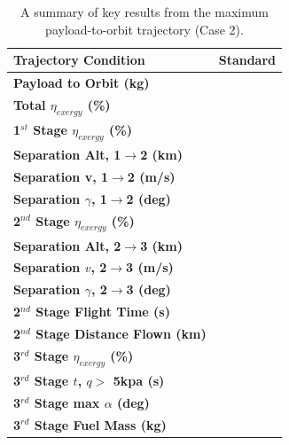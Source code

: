 \begin{table}[ht]
	\centering
\begin{tabular}{l c } 
	\hline \textbf{Trajectory Condition}
	&Standard
	\\
	\hline \textbf{Payload to Orbit (kg)}
	& \textbf{\PayloadToOrbitStandardNoReturn}
	\\
	\textbf{Total $\eta_{exergy}$ (\%)}
	& \textbf{\totalExergyEffStandardNoReturn}
	\\
	\hline 
	\textbf{1$^{st}$ Stage $\eta_{exergy}$ (\%)}
	& \textbf{\firstExergyEffStandardNoReturn}
	\\

	\textbf{Separation Alt, 1$\rightarrow$2 (km)}
	& \firstsecondSeparationAltStandardNoReturn
	\\
	\textbf{Separation v, 1$\rightarrow$2 (m/s)}
	& \firstsecondSeparationvStandardNoReturn
	\\
	\textbf{Separation $\gamma$, 1$\rightarrow$2 (deg)}
	& \firstsecondSeparationgammaStandardNoReturn
	\\
	\hline 
	\textbf{2$^{nd}$ Stage $\eta_{exergy}$ (\%)}
	& \textbf{\secondExergyEffStandardNoReturn}
	\\

	\textbf{Separation Alt, 2$\rightarrow$3 (km)}
	& \secondthirdSeparationAltStandardNoReturn
	\\
	\textbf{Separation $v$, 2$\rightarrow$3 (m/s)}
	& \secondthirdSeparationvStandardNoReturn
	\\
	\textbf{Separation $\gamma$, 2$\rightarrow$3 (deg)}
	& \secondthirdSeparationgammaStandardNoReturn
	\\
	\textbf{2$^{nd}$ Stage Flight Time (s)}
	& \secondFlightTimeStandardNoReturn
	\\
	\textbf{2$^{nd}$ Stage Distance Flown (km)}
	& \SecondDistStandardNoReturn
	\\
	\hline 
	\textbf{3$^{rd}$ Stage $\eta_{exergy}$ (\%)}
	& \textbf{\thirddExergyEffStandardNoReturn}
	\\

	\textbf{3$^{rd}$ Stage $t$, $q >$ 5kpa (s)}
	& \thirdqOverFiveStandardNoReturn
	\\
	\textbf{3$^{rd}$ Stage max $\alpha$ (deg)}
	& \thirdmaxAoAStandardNoReturn
	\\
	\textbf{3$^{rd}$ Stage Fuel Mass (kg)}
	& \thirdmFuelStandardNoReturn
	\\
	\hline 
\end{tabular} 
	\caption{A summary of key results from the maximum payload-to-orbit trajectory (Case 2).}
	\label{tab:summaryStandardNoReturn}
\end{table}







